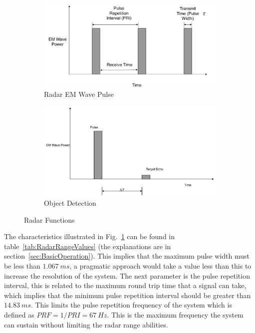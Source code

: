 \documentclass[11pt]{witseiepaper}
\begin{document}
\begin{bibunit}[witseie]
\begin{figure}[htb]
    \centering
    \begin{subfigure}{.5\textwidth}
        \centering
            \includegraphics[width=0.9\linewidth]{Pulsing.pdf}
            \caption{Radar EM Wave Pulse}
            \label{fig:Pulsing}
        \end{subfigure}%
        \begin{subfigure}{.5\textwidth}
            \centering
            \includegraphics[width=0.9\linewidth]{ObjectDetection.pdf}
            \caption{Object Detection}
                \label{fig:ObjectDetection}
            \end{subfigure}
\caption{Radar Functions}
\label{fig:RadarFunctions}
\end{figure}

The characteristics illustrated in Fig.~\ref{fig:Pulsing} can be found in table~\ref{tab:RadarRangeValues} (the explanations are in section~\ref{sec:BasicOperation}). This implies that the maximum pulse width must be less than $1.067~ms$, a pragmatic approach would take a value less than this to increase the resolution of the system.
The next parameter is the pulse repetition interval, this is related to the maximum round trip time that a signal can take, which implies that the minimum pulse repetition interval should be greater than $14.83~ms$. This limits the pulse repetition frequency of the system which is defined as $PRF = 1/PRI = 67~Hz$. This is the maximum frequency the system can sustain without limiting the radar range abilities.


\end{bibunit}
\end{document}
